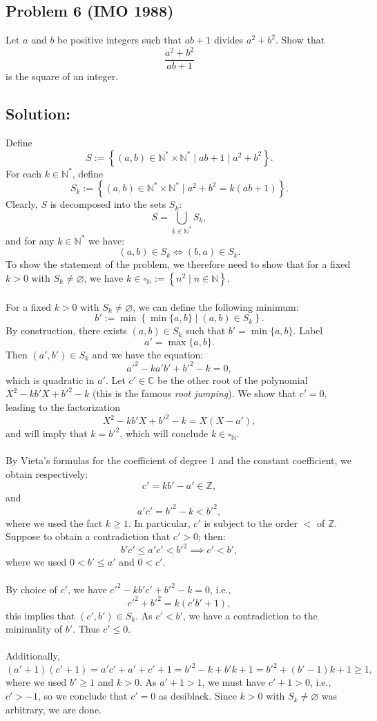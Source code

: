 \documentclass[11pt, a4paper, oneside]{article}
\newcommand{\solution}[1][]{\subsection*{#1}\hfill \par}
\theoremstyle{remark}
\theoremstyle{lemma}
\begin{document}
\subsection{Problem 6 (IMO 1988)}
Let \( a \) and \( b \) be positive integers such that \( ab + 1 \) divides \( a^{2} + b^{2} \). Show that
\[ \frac{a^{2} + b^{2}}{ab + 1} \]
is the square of an integer.

\solution[Solution:]
Define
\[
S := \left\{ (a,b) \in \mathbb{N}^{*} \times \mathbb{N}^{*} \mid ab+1 \mid a^2 + b^2 \right\}.
\]
For each \( k \in \mathbb{N}^{*} \), define
\[
S_k := \left\{ (a,b) \in \mathbb{N}^{*} \times \mathbb{N}^{*} \mid a^2 + b^2 = k(ab+1) \right\}.
\]
Clearly, \( S \) is decomposed into the sets \( S_k \):
\[
S = \bigcup_{k \in \mathbb{N}^{*}} S_k,
\]
and for any \( k \in \mathbb{N}^{*} \) we have:
\[
(a,b) \in S_k \Leftrightarrow (b,a) \in S_k.
\]
To show the statement of the problem, we therefore need to show that for a fixed \( k > 0 \) with \( S_k \neq \varnothing \), we have \( k \in \square_{\mathbb{N}} := \left\{ n^2 \mid n \in \mathbb{N} \right\} \).
\\\\
For a fixed \( k > 0 \) with \( S_k \neq \varnothing \), we can define the following minimum:
\[
b' := \min \left\{ \min\{a,b\} \mid (a,b) \in S_k \right\}.
\]
By construction, there exists \( (a,b) \in S_k \) such that \( b' = \min\{a,b\} \). Label
\[
a' = \max\{a, b\}.
\]
Then \( (a',b') \in S_k \) and we have the equation:
\[
a'^2 - k a' b' + b'^2 - k = 0,
\]
which is quadratic in \( a' \). Let \( c' \in \mathbb{C} \) be the other root of the polynomial \( X^2 - k b' X + b'^2 - k \) (this is the famous \textit{root jumping}). We show that \( c' = 0 \), leading to the factorization
\[
X^2 - k b' X + b'^2 - k = X(X - a'),
\]
and will imply that \( k = b'^2 \), which will conclude $k\in\square_{\mathbb{N}}$.
\\\\
By Vieta's formulas for the coefficient of degree 1 and the constant coefficient, we obtain respectively:
\[
c' = k b' - a' \in \mathbb{Z},
\]
and
\[
a' c' = b'^2 - k < b'^2,
\]
where we used the fact \( k \geq 1 \). In particular, \( c' \) is subject to the order \( < \) of \( \mathbb{Z} \). Suppose to obtain a contradiction that \( c' > 0 \); then:
\[
b' c' \leq a' c' < b'^2 \implies c' < b',
\]
where we used \( 0 < b' \leq a' \) and \( 0 < c' \).
\\\\
By choice of \( c' \), we have \( c'^2 - k b' c' + b'^2 - k = 0 \), i.e.,
\[
c'^2 + b'^2 = k(c' b' + 1),
\]
this implies that \( (c',b') \in S_k \). As \( c' < b' \), we have a contradiction to the minimality of \( b' \). Thus \( c' \leq 0 \). 
\\\\
Additionally,
\[
(a' + 1)(c' + 1) = a' c' + a' + c' + 1 = b'^2 - k + b' k + 1 = b'^2 + (b' - 1)k + 1 \geq 1,
\]
where we used \( b' \geq 1 \) and \( k > 0 \). As \( a' + 1 > 1 \), we must have \( c' + 1 > 0 \), i.e., \( c' > -1 \), so we conclude that \( c' = 0 \) as desiblack. Since \( k > 0 \) with \( S_k \neq \varnothing \) was arbitrary, we are done.
\end{document}
